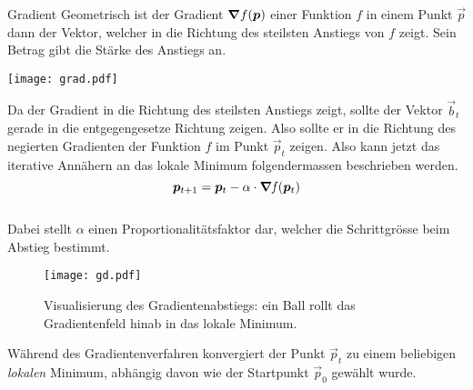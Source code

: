 \begin{appendices}
\begin{defbox}{Gradient}
  Geometrisch ist der Gradient $\bm{\nabla}f(\bm{p})$ einer Funktion $f$ in
  einem Punkt $\vec{p}$ dann der Vektor, welcher in die Richtung des steilsten
  Anstiegs von $f$ zeigt. Sein Betrag gibt die Stärke des Anstiegs an.
  \para{}
  \begin{center}
    \texttt{[image: grad.pdf]}
  \end{center}
\end{defbox}
\para{}
Da der Gradient in die Richtung des steilsten Anstiegs zeigt, sollte der Vektor
$\vec{b}_t$ gerade in die entgegengesetze Richtung zeigen. Also sollte er in die Richtung des negierten Gradienten der Funktion $f$ im Punkt $\vec{p}_t$ zeigen.
Also kann jetzt das iterative Annähern an das lokale Minimum folgendermassen beschrieben
werden.
\\
\begin{equation}\label{eq:gradientdescent}
  \bm{p}_{t+1} = \bm{p}_t - \alpha \cdot \bm{\nabla} \mathit{f}(\bm{p}_t)
\end{equation}
\\
Dabei stellt $\alpha$ einen Proportionalitätsfaktor dar, welcher die
Schrittgrösse beim Abstieg bestimmt.

\ifcp%
\begin{figure}[h!]
  \centering
  \texttt{[image: gd.pdf]}
  \caption{Visualisierung des Gradientenabstiegs: ein Ball rollt das
    Gradientenfeld hinab in das lokale Minimum.}
\end{figure}
\fi%

Während des Gradientenverfahren konvergiert der Punkt $\vec{p}_t$ zu einem
beliebigen \textit{lokalen} Minimum, abhängig davon wie der Startpunkt
$\vec{p}_0$ gewählt wurde.


\end{appendices}
